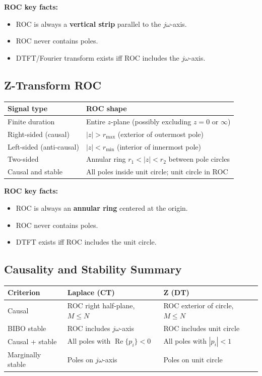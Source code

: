 \documentclass{article}
\begin{document}
\textbf{ROC key facts:}
\begin{itemize}
  \item ROC is always a \textbf{vertical strip} parallel to the $j\omega$-axis.
  \item ROC never contains poles.
  \item DTFT/Fourier transform exists iff ROC includes the $j\omega$-axis.
\end{itemize}

\subsection{Z-Transform ROC}

\begin{center}
\begin{tabular}{ll}
\toprule
Signal type & ROC shape \\
\midrule
Finite duration & Entire $z$-plane (possibly excluding $z=0$ or $\infty$) \\
Right-sided (causal) & $|z| > r_{\max}$ (exterior of outermost pole) \\
Left-sided (anti-causal) & $|z| < r_{\min}$ (interior of innermost pole) \\
Two-sided & Annular ring $r_1 < |z| < r_2$ between pole circles \\
Causal and stable & All poles inside unit circle; unit circle in ROC \\
\bottomrule
\end{tabular}
\end{center}

\textbf{ROC key facts:}
\begin{itemize}
  \item ROC is always an \textbf{annular ring} centered at the origin.
  \item ROC never contains poles.
  \item DTFT exists iff ROC includes the unit circle.
\end{itemize}

\subsection{Causality and Stability Summary}

\begin{center}
\begin{tabular}{lll}
\toprule
Criterion & Laplace (CT) & Z (DT) \\
\midrule
Causal & ROC right half-plane, $M\le N$ & ROC exterior of circle, $M\le N$ \\
BIBO stable & ROC includes $j\omega$-axis & ROC includes unit circle \\
Causal + stable & All poles with $\operatorname{Re}\{p_i\}<0$ & All poles with $|p_i|<1$ \\
Marginally stable & Poles on $j\omega$-axis & Poles on unit circle \\
\bottomrule
\end{tabular}
\end{center}
\end{document}
